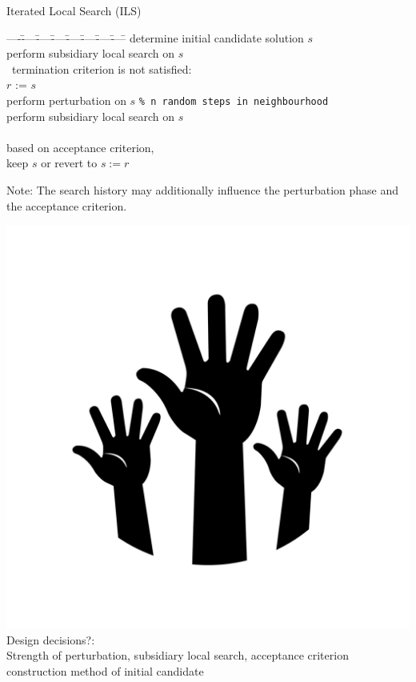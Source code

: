 \begin{frame}[c]{Iterated Local Search (ILS)}

\begin{tabbing}
----\=----\=----\=----\=----\=----\=----\=----\=\kill
\> determine initial candidate solution $s$\\
\> perform subsidiary local search on $s$\\
\> \pscWhile\ termination criterion is not satisfied:\\
\> \vbar \> $r$ := $s$\\[-0.55ex]
\> \vbar \> perform perturbation on $s$ \hspace{0.8em} \texttt{\% n random steps in neighbourhood}\\[-0.55ex]
\> \vbar \> perform subsidiary local search on $s$\\[-0.55ex]
\> \vbar \\[-1.5ex]
\> \vbar\> based on acceptance criterion, \\[-0.55ex]
\> \vend \> \> keep $s$ or revert to $s:=r$
\end{tabbing}

Note: The search history may additionally influence the perturbation phase
and the acceptance criterion.

\medskip
\includegraphics[scale=.03]{images/hands.png}
\alert{Design decisions?}:\\
\pause Strength of perturbation, subsidiary local search, acceptance criterion\\ 
construction method of initial candidate

\end{frame}

